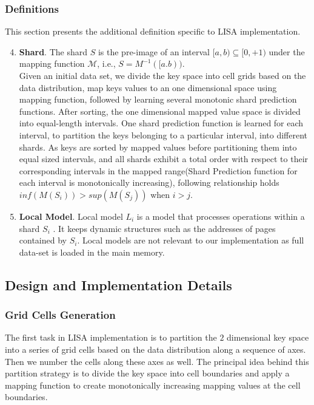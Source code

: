 \subsubsection{Definitions}

This section presents the additional definition specific to LISA implementation.

\begin{enumerate}
\setcounter{enumi}{3}
	\item \textbf{Shard}. The shard $S$ is the pre-image of an
interval $[a, b) \subseteq [0, +1)$ under the mapping function $\mathcal{M}$,  i.e., $S = M^{-1}([a.b))$. \\
Given an initial data set, we divide the key space into cell grids based on the data distribution, map keys values to an one dimensional space using mapping function, followed by learning several monotonic shard prediction functions. After sorting, the one dimensional mapped value space is divided into equal-length intervals. One shard prediction function is learned for each interval, to partition the keys belonging to a particular interval, into different shards. As keys are sorted by mapped values before partitioning them into equal sized intervals, and all shards exhibit a total order with respect to their corresponding intervals in the mapped range(Shard Prediction function for each interval is monotonically increasing), following relationship holds \\
$ inf (M(S_{i}))  > sup (M(S_{j}))$ when $i > j$.

\item \textbf{Local Model}. Local model $L_{i}$ is a model that processes operations within a shard $S_i$ . It keeps dynamic structures such as the addresses of pages contained by $S_{i}$. Local models are not relevant to our implementation as full data-set is loaded in the main memory.
\end{enumerate}

\subsection{Design and Implementation Details}
\subsubsection{Grid Cells Generation}
The first task in LISA implementation is to partition the $2$ dimensional key space into a series of grid cells based on the data distribution along a sequence of axes. Then we number the cells along these axes as well. The principal idea behind this partition strategy is to divide the key space into cell boundaries and apply a mapping function to create monotonically increasing mapping values at the cell boundaries. 

